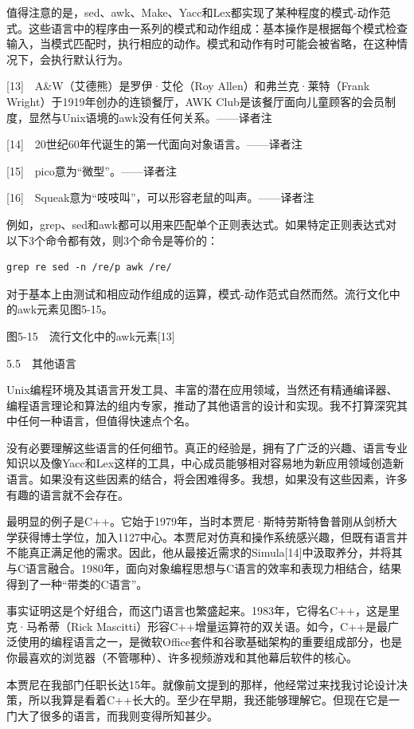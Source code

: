 \documentclass[a4paper,12pt,UTF8,twoside]{ctexbook}
\begin{document}
值得注意的是，sed、awk、Make、Yacc和Lex都实现了某种程度的模式-动作范式。这些语言中的程序由一系列的模式和动作组成：基本操作是根据每个模式检查输入，当模式匹配时，执行相应的动作。模式和动作有时可能会被省略，在这种情况下，会执行默认行为。

[13]　A\&W（艾德熊）是罗伊·艾伦（Roy Allen）和弗兰克·莱特（Frank Wright）于1919年创办的连锁餐厅，AWK Club是该餐厅面向儿童顾客的会员制度，显然与Unix语境的awk没有任何关系。——译者注

[14]　20世纪60年代诞生的第一代面向对象语言。——译者注

[15]　pico意为“微型”。——译者注

[16]　Squeak意为“吱吱叫”，可以形容老鼠的叫声。——译者注

例如，grep、sed和awk都可以用来匹配单个正则表达式。如果特定正则表达式对以下3个命令都有效，则3个命令是等价的：
\begin{lstlisting}
grep re sed -n /re/p awk /re/
\end{lstlisting}
对于基本上由测试和相应动作组成的运算，模式-动作范式自然而然。流行文化中的awk元素见图5-15。



图5-15　流行文化中的awk元素[13]





5.5　其他语言


Unix编程环境及其语言开发工具、丰富的潜在应用领域，当然还有精通编译器、编程语言理论和算法的组内专家，推动了其他语言的设计和实现。我不打算深究其中任何一种语言，但值得快速点个名。

没有必要理解这些语言的任何细节。真正的经验是，拥有了广泛的兴趣、语言专业知识以及像Yacc和Lex这样的工具，中心成员能够相对容易地为新应用领域创造新语言。如果没有这些因素的结合，将会困难得多。我想，如果没有这些因素，许多有趣的语言就不会存在。

最明显的例子是C++。它始于1979年，当时本贾尼·斯特劳斯特鲁普刚从剑桥大学获得博士学位，加入1127中心。本贾尼对仿真和操作系统感兴趣，但既有语言并不能真正满足他的需求。因此，他从最接近需求的Simula[14]中汲取养分，并将其与C语言融合。1980年，面向对象编程思想与C语言的效率和表现力相结合，结果得到了一种“带类的C语言”。

事实证明这是个好组合，而这门语言也繁盛起来。1983年，它得名C++，这是里克·马希蒂（Rick Mascitti）形容C++增量运算符的双关语。如今，C++是最广泛使用的编程语言之一，是微软Office套件和谷歌基础架构的重要组成部分，也是你最喜欢的浏览器（不管哪种）、许多视频游戏和其他幕后软件的核心。

本贾尼在我部门任职长达15年。就像前文提到的那样，他经常过来找我讨论设计决策，所以我算是看着C++长大的。至少在早期，我还能够理解它。但现在它是一门大了很多的语言，而我则变得所知甚少。
\end{document}
